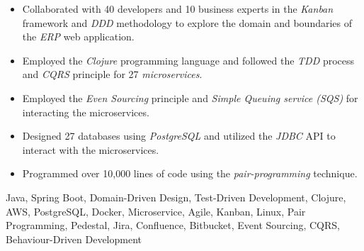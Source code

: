 \begin{experiences}
{
  \begin{itemize}
  \item Collaborated with 40 developers and 10 business experts in the \emph{Kanban} framework and \emph{DDD} methodology to explore the domain and boundaries of the \textit{ERP} web application.
  \item Employed the \emph{Clojure} programming language and followed the \emph{TDD} process and \textit{CQRS} principle for 27 \emph{microservices}.
  \item Employed the \textit{Even Sourcing} principle and \textit{Simple Queuing service (SQS)} for interacting the microservices.
  \item Designed 27 databases using \emph{PostgreSQL} and utilized the \emph{JDBC} API to interact with the microservices.
  \item Programmed over 10,000 lines of code using the \emph{pair-programming} technique.
  \end{itemize}
  }
  {Java, Spring Boot, Domain-Driven Design, Test-Driven Development, Clojure, AWS, PostgreSQL, Docker, Microservice, Agile, Kanban, Linux, Pair Programming, Pedestal, Jira, Confluence, Bitbucket, Event Sourcing, CQRS, Behaviour-Driven Development}
  
 \emptySeparator
  

\end{experiences}
